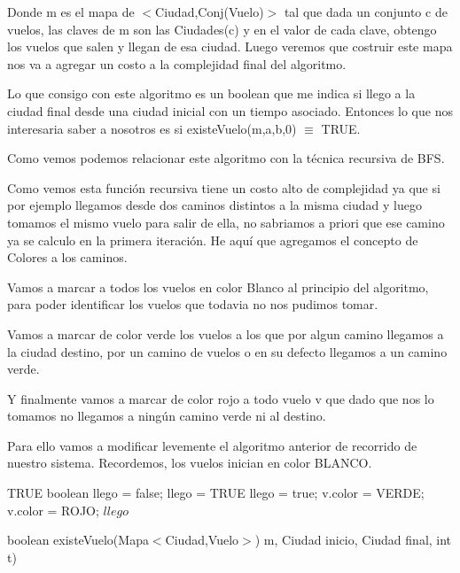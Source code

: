 Donde m es el mapa de $<$Ciudad,Conj(Vuelo)$>$ tal que dada un conjunto c de vuelos, las claves de m son las Ciudades(c) y en el valor de cada clave, obtengo los vuelos que salen y llegan de esa ciudad. Luego veremos que costruir este mapa nos va a agregar un costo a la complejidad final del algoritmo.  

Lo que consigo con este algoritmo es un boolean que me indica si llego a la ciudad final desde una ciudad inicial con un tiempo asociado. Entonces lo que nos interesaria saber a nosotros es si existeVuelo(m,a,b,0) $\equiv$ TRUE. 

Como vemos podemos relacionar este algoritmo con la t\'ecnica recursiva de BFS.

Como vemos esta funci\'on recursiva tiene un costo alto de complejidad ya que si por ejemplo llegamos desde dos caminos distintos a la misma ciudad y luego tomamos el mismo vuelo para salir de ella, no sabriamos a priori que ese camino ya se calculo en la primera iteraci\'on. He aqu\'i que agregamos el concepto de Colores a los caminos.

Vamos a marcar a todos los vuelos en color Blanco al principio del algoritmo, para poder identificar los vuelos que todavia no nos pudimos tomar.

Vamos a marcar de color verde los vuelos a los que por algun camino llegamos a la ciudad destino, por un camino de vuelos o en su defecto llegamos a un camino verde.

Y finalmente vamos a marcar de color rojo a todo vuelo v que dado que nos lo tomamos no llegamos a ning\'un camino verde ni al destino.

Para ello vamos a modificar levemente el algoritmo anterior de recorrido de nuestro sistema. Recordemos, los vuelos inician en color BLANCO.

\begin{algorithm}[H]
\begin{algorithmic}[1]
		\RETURN TRUE
\ENDIF
\STATE boolean llego = false;
			\STATE llego = TRUE
        \ENDIF
				\STATE llego = true;
				\STATE v.color = VERDE;
			\ELSE
				\STATE v.color = ROJO;								
	    		\ENDIF    			
		\ENDIF		    
    \ENDIF
\ENDFOR
\RETURN $llego$
\caption{boolean existeVuelo(Mapa$<$Ciudad,Vuelo$>$) m, Ciudad inicio, Ciudad final, int t)}%
\end{algorithmic}
\end{algorithm}

